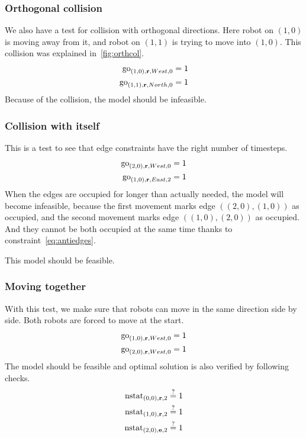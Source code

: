\subsubsection{Orthogonal collision}
We also have a test for collision with orthogonal directions.
Here robot on $(1,0)$ is moving away from it, and robot on $(1,1)$ is trying to
move into $(1,0)$. This collision was explained in~\autoref{fig:orthcol}.
\begin{align}
    \mathrm{go}_{(1,0),\text{\bf r},West,0} &= 1\\
    \mathrm{go}_{(1,1),\text{\bf r},North,0} &= 1
\end{align}
Because of the collision, the model should be infeasible.
\subsubsection{Collision with itself}
This is a test to see that edge constraints have the right number of timesteps.
\begin{align}
    \mathrm{go}_{(2,0),\text{\bf r},West,0} &= 1\\
    \mathrm{go}_{(1,0),\text{\bf r},East,2} &= 1
\end{align}
When the edges are occupied for longer than actually needed, the model will
become infeasible, because the first movement marks edge $((2,0),(1,0))$ as
occupied, and the second movement marks edge $((1,0),(2,0))$ as occupied. And
they cannot be both occupied at the same time thanks to
constraint~\eqref{eq:antiedges}.

This model should be feasible.
\subsubsection{Moving together}
With this test, we make sure that robots can move in the same direction side by
side.
Both robots are forced to move at the start.
\begin{align}
    \mathrm{go}_{(1,0),\text{\bf r},West,0} &= 1\\
    \mathrm{go}_{(2,0),\text{\bf r},West,0} &= 1
\end{align}
The model should be feasible and optimal solution is also verified by following
checks.
\begin{align}
    \mathrm{nstat}_{(0,0), \text{\bf r}, 2} &\overset{?}{=} 1\\
    \mathrm{nstat}_{(1,0), \text{\bf r}, 2} &\overset{?}{=} 1\\
    \mathrm{nstat}_{(2,0), \text{\bf e}, 2} &\overset{?}{=} 1
\end{align}

